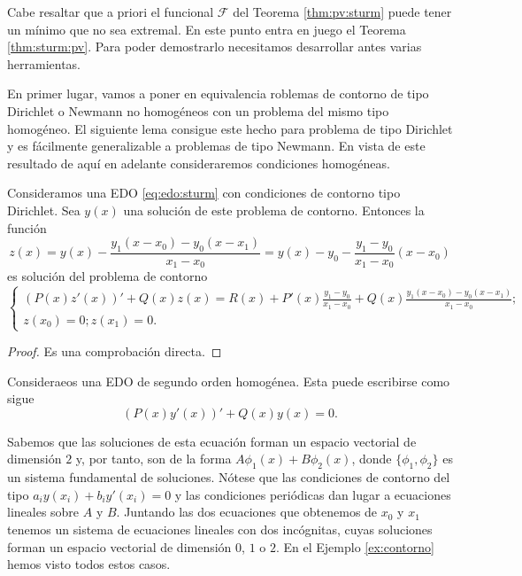 \documentclass{article}
\begin{document}
Cabe resaltar que a priori el funcional $\mathcal{F}$ del Teorema \ref{thm:pv:sturm} puede tener un
mínimo que no sea extremal. En este punto entra en juego el Teorema \ref{thm:sturm:pv}. Para poder
demostrarlo necesitamos desarrollar antes varias herramientas.


En primer lugar, vamos a poner en equivalencia roblemas de contorno de tipo Dirichlet o Newmann no
homogéneos con un problema del mismo tipo homogéneo. El siguiente lema consigue este hecho para
problema de tipo Dirichlet y es fácilmente generalizable a problemas de tipo Newmann. En vista de
este resultado de aquí en adelante consideraremos condiciones homogéneas.


\begin{lemma} \label{lem:pc:hom} Consideramos una EDO \eqref{eq:edo:sturm} con condiciones de
  contorno tipo Dirichlet. Sea $y(x)$ una solución de este problema de contorno. Entonces la función
  \[ z(x) = y(x) - \frac{y_1(x-x_0) - y_0(x-x_1)}{x_1- x_0} = y(x) - y_0 - \frac{y_1 - y_0}{x_1-
      x_0}(x-x_0) \] es solución del problema de contorno
  \[
    \begin{cases}
      (P(x)z'(x))' + Q(x)z(x) = R(x) + P'(x) \frac{y_1 - y_0}{x_1- x_0} + Q(x)  \frac{y_1(x-x_0) - y_0(x-x_1)}{x_1- x_0}; \\
      z(x_0) = 0; z(x_1) = 0.
    \end{cases}
  \]
\end{lemma}
\begin{proof}
  Es una comprobación directa.
\end{proof}

Consideraeos una EDO de segundo orden homogénea. Esta puede escribirse como sigue
\begin{equation}
  \label{eq:sturm:eh}
  (P(x)y'(x))' + Q(x)y(x) = 0.
  \tag{SH}
\end{equation}

Sabemos que las soluciones de esta ecuación forman un espacio vectorial de dimensión $2$ y, por
tanto, son de la forma $A \phi_1(x) + B \phi_2(x)$, donde $\{\phi_1, \phi_2\}$ es un sistema
fundamental de soluciones. Nótese que las condiciones de contorno del tipo
$a_i y(x_i) + b_i y'(x_i) = 0$ y las condiciones periódicas dan lugar a ecuaciones lineales sobre
$A$ y $B$. Juntando las dos ecuaciones que obtenemos de $x_0$ y $x_1$ tenemos un sistema de
ecuaciones lineales con dos incógnitas, cuyas soluciones forman un espacio vectorial de dimensión
$0$, $1$ o $2$. En el Ejemplo \ref{ex:contorno} hemos visto todos estos casos.
\end{document}
